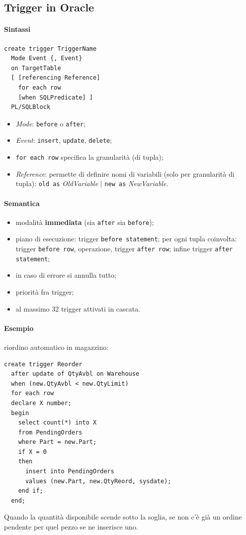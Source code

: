 \documentclass[a4paper,12pt]{article}
\begin{document}
\subsection{Trigger in Oracle}

\paragraph{Sintassi}
\begin{verbatim}
create trigger TriggerName
  Mode Event {, Event}
  on TargetTable
  [ [referencing Reference]
    for each row
    [when SQLPredicate] ]
  PL/SQLBlock
\end{verbatim}
\begin{itemize}
  \item \emph{Mode}: \texttt{before} o \texttt{after};
  \item \emph{Event}: \texttt{insert}, \texttt{update}, \texttt{delete};
  \item \texttt{for each row} specifica la granularità (di tupla);
  \item \emph{Reference}: permette di definire nomi di variabili (solo per
    granularità di tupla): \texttt{old as} \emph{OldVariable} $|$
    \texttt{new as} \emph{NewVariable}.
\end{itemize}

\paragraph{Semantica}
\begin{itemize}
  \item modalità \textbf{immediata} (sia \texttt{after} sia \texttt{before});
  \item piano di esecuzione: trigger \texttt{before statement}; per ogni tupla
    coinvolta: trigger \texttt{before row}, operazione, trigger \texttt{after
    row}; infine trigger \texttt{after statement};
  \item in caso di errore si annulla tutto;
  \item priorità fra trigger;
  \item al massimo 32 trigger attivati in cascata.
\end{itemize}

\paragraph{Esempio} riordino automatico in magazzino:
\begin{verbatim}
create trigger Reorder
  after update of QtyAvbl on Warehouse
  when (new.QtyAvbl < new.QtyLimit)
  for each row
  declare X number;
  begin
    select count(*) into X
    from PendingOrders
    where Part = new.Part;
    if X = 0
    then
      insert into PendingOrders
      values (new.Part, new.QtyReord, sysdate);
    end if;
  end;
\end{verbatim}
Quando la quantità disponibile scende sotto la soglia, se non c'è già un
ordine pendente per quel pezzo se ne inserisce uno.
\end{document}
